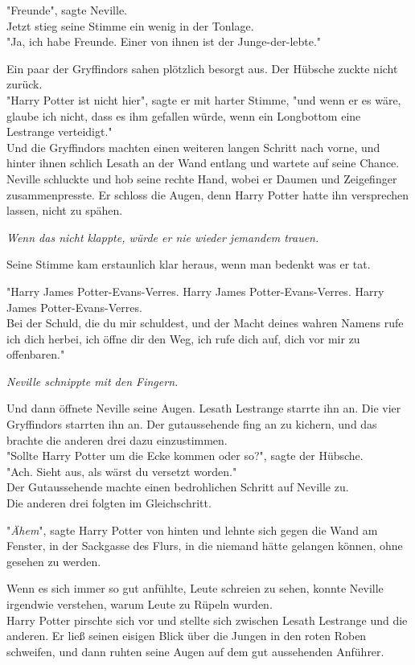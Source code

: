 {"Freunde", sagte Neville.\\ Jetzt stieg seine Stimme ein wenig in der Tonlage.\\ "Ja, ich habe Freunde. Einer von ihnen ist der Junge-der-lebte."

Ein paar der Gryffindors sahen plötzlich besorgt aus. Der Hübsche zuckte nicht zurück.\\ "Harry Potter ist nicht hier", sagte er mit harter Stimme, "und wenn er es wäre, glaube ich nicht, dass es ihm gefallen würde, wenn ein Longbottom eine Lestrange verteidigt."\\ Und die Gryffindors machten einen weiteren langen Schritt nach vorne, und hinter ihnen schlich Lesath an der Wand entlang und wartete auf seine Chance.\\ Neville schluckte und hob seine rechte Hand, wobei er Daumen und Zeigefinger zusammenpresste. Er schloss die Augen, denn Harry Potter hatte ihn versprechen lassen, nicht zu spähen.

\emph{Wenn das nicht klappte, würde er nie wieder jemandem trauen.}

Seine Stimme kam erstaunlich klar heraus, wenn man bedenkt was er tat.

"Harry James Potter-Evans-Verres. Harry James Potter-Evans-Verres. Harry James Potter-Evans-Verres.\\ Bei der Schuld, die du mir schuldest, und der Macht deines wahren Namens rufe ich dich herbei, ich öffne dir den Weg, ich rufe dich auf, dich vor mir zu offenbaren."

\emph{Neville schnippte mit den Fingern.}

Und dann öffnete Neville seine Augen. Lesath Lestrange starrte ihn an. Die vier Gryffindors starrten ihn an. Der gutaussehende fing an zu kichern, und das brachte die anderen drei dazu einzustimmen.\\ "Sollte Harry Potter um die Ecke kommen oder so?", sagte der Hübsche.\\ "Ach. Sieht aus, als wärst du versetzt worden."\\ Der Gutaussehende machte einen bedrohlichen Schritt auf Neville zu.\\ Die anderen drei folgten im Gleichschritt.

"\emph{Ähem}", sagte Harry Potter von hinten und lehnte sich gegen die Wand am Fenster, in der Sackgasse des Flurs, in die niemand hätte gelangen können, ohne gesehen zu werden.

Wenn es sich immer so gut anfühlte, Leute schreien zu sehen, konnte Neville irgendwie verstehen, warum Leute zu Rüpeln wurden.\\ Harry Potter pirschte sich vor und stellte sich zwischen Lesath Lestrange und die anderen. Er ließ seinen eisigen Blick über die Jungen in den roten Roben schweifen, und dann ruhten seine Augen auf dem gut aussehenden Anführer.

}

